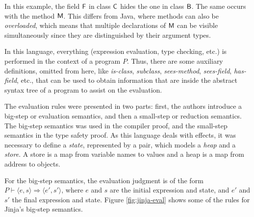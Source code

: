 \documentclass[tese,capa,english]{texufpel}
\def\resethooks{%
  \global\let\SaveRestoreHook\empty
  \global\let\ColumnHook\empty}
\let\hspre\empty
\let\hspost\empty
\newcommand{\V}[1]{\black{\mathsf{#1}}}
\newcommand{\JK}[1]{\purple{\mathsf{#1}}}
\newcommand{\JC}[1]{\green{\mathsf{#1}}}
\newcommand{\JM}[1]{\blue{\mathsf{#1}}}
\begin{document}
\resethooks

In this example, the field \ensuremath{\V{F}} in class \ensuremath{\JC{C}} hides the one in class \ensuremath{\JC{B}}. The same occurs with the method \ensuremath{\JM{M}}. This differs from Java, where methods can also be \emph{overloaded}, which means that multiple declarations of \ensuremath{\JM{M}} can be visible simultaneously since they are distinguished by their argument types. 

In this language, everything (expression evaluation, type checking, etc.) is performed in the context of a program $P$. Thus, there are some auxiliary definitions, omitted from here, like \emph{is-class}, \emph{subclass}, \emph{sees-method}, \emph{sees-field}, \emph{has-field}, etc., that can be used to obtain information that are inside the abstract syntax tree of a program to assist on the evaluation.

The evaluation rules were presented in two parts: first, the authors introduce a big-step or evaluation semantics, and then a small-step or reduction semantics. The big-step semantics was used in the compiler proof, and the small-step semantics in the type safety proof. As this language deals with effects, it was necessary to define a \emph{state}, represented by a pair, which models a \emph{heap} and a \emph{store}. A store is a map from variable names to values and a heap is a map from address to objects.

For the big-step semantics, the evaluation judgment is of the form $P \vdash \langle e, s \rangle \Rightarrow \langle e', s' \rangle$, where $e$ and $s$ are the initial expression and state, and $e'$ and $s'$ the final expression and state. Figure \ref{fig:jinja-eval} shows some of the rules for Jinja's big-step semantics.
\end{document}
